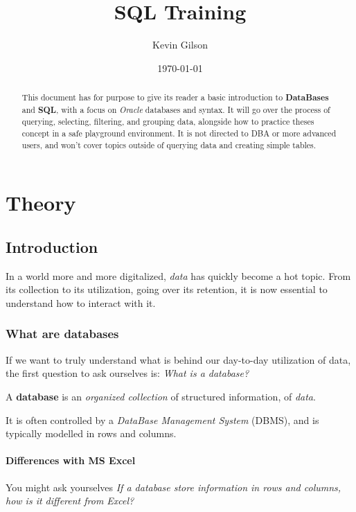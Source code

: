 \documentclass[12pt, letterpaper]{report}
\title{SQL Training}
\author{Kevin Gilson}
\date{\today{}}
\begin{document}
\maketitle

\begin{abstract}
This document has for purpose to give its reader a basic introduction to \textbf{DataBases} and \textbf{SQL}, with a focus on \textit{Oracle} databases and syntax.
It will go over the process of querying, selecting, filtering, and grouping data, alongside how to practice theses concept in a safe playground environment.
It is not directed to DBA or more advanced users, and won't cover topics outside of querying data and creating simple tables.
\end{abstract}

\tableofcontents

\part{Theory}

\chapter{Introduction}

In a world more and more digitalized, \textit{data} has quickly become a hot topic.
From its collection to its utilization, going over its retention, it is now essential to understand how to interact with it.

\section{What are databases}

If we want to truly understand what is behind our day-to-day utilization of data, the first question to ask ourselves is: \textit{What is a database?}

A \textbf{database} is an \textit{organized collection} of structured information, of \textit{data}.

It is often controlled by a \textit{DataBase Management System} (DBMS), and is typically modelled in rows and columns.

\subsection{Differences with MS Excel}

You might ask yourselves \textit{If a database store information in rows and columns, how is it different from Excel?}
\end{document}

